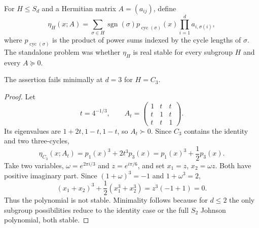 For $H\le S_d$ and a Hermitian matrix $A=(a_{ij})$, define
\[
\eta_H(x;A)=\sum_{\sigma\in H}\operatorname{sgn}(\sigma)
 p_{\operatorname{cyc}(\sigma)}(x)\prod_{i=1}^d a_{i,\sigma(i)},
\]
where $p_{\operatorname{cyc}(\sigma)}$ is the product of power sums indexed by the cycle lengths of $\sigma$.  The standalone problem was whether $\eta_H$ is real stable for every subgroup $H$ and every $A\succeq0$.

\begin{theorem}\label{thm:subgroup}
The assertion fails minimally at $d=3$ for $H=C_3$.
\end{theorem}
\begin{proof}
Let
\[
t=4^{-1/3},\qquad
A_t=\begin{pmatrix}1&t&t\\t&1&t\\t&t&1\end{pmatrix}.
\]
Its eigenvalues are $1+2t,1-t,1-t$, so $A_t\succ0$.  Since $C_3$ contains the identity and two three-cycles,
\[
\eta_{C_3}(x;A_t)=p_1(x)^3+2t^3p_3(x)=p_1(x)^3+\frac12p_3(x).
\]
Take two variables, $\omega=e^{2\pi i/3}$ and $z=e^{i\pi/6}$, and set $x_1=z$, $x_2=\omega z$.  Both have positive imaginary part.  Since $(1+\omega)^3=-1$ and $1+\omega^3=2$,
\[
(x_1+x_2)^3+\frac12(x_1^3+x_2^3)=z^3(-1+1)=0.
\]
Thus the polynomial is not stable.  Minimality follows because for $d\le2$ the only subgroup possibilities reduce to the identity case or the full $S_2$ Johnson polynomial, both stable.
\end{proof}

